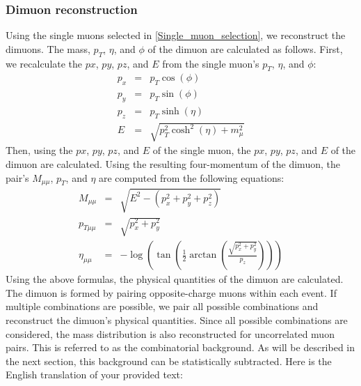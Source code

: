             \subsubsection{Dimuon reconstruction}
            \label{Dimuon_reco}
                Using the single muons selected in \ref{Single_muon_selection}, we reconstruct the dimuons. The mass, $p_T$, $\eta$, and $\phi$ of the dimuon are calculated as follows. First, we recalculate the $px$, $py$, $pz$, and $E$ from the single muon’s $p_T$, $\eta$, and $\phi$:
                \begin{eqnarray}
                    p_x &=& p_T \cos(\phi)\\
                    p_y &=& p_T \sin (\phi)\\
                    p_z &=& p_T \sinh (\eta)\\
                    E &=& \sqrt{p_T^2 \cosh^2(\eta) + m_\mu^2} 
                \end{eqnarray}
                Then, using the $px$, $py$, $pz$, and $E$ of the single muon, the $px$, $py$, $pz$, and $E$ of the dimuon are calculated. Using the resulting four-momentum of the dimuon, the pair’s $M_{\mu\mu}$, $p_T$, and $\eta$ are computed from the following equations:
                \begin{eqnarray}
                    M_{\mu\mu} &=& \sqrt{E^2 - (p_x^2 + p_y^2 + p_z^2)}\\
                    p_{T\mu\mu} &=& \sqrt{p_x^2 + p_y^2}\\
                    \eta_{\mu\mu} &=& -\log\left(\tan\left(\frac{1}{2}\arctan\left(\frac{\sqrt{p_x^2 + p_y^2}}{p_z}\right)\right)\right)
                \end{eqnarray}
                Using the above formulas, the physical quantities of the dimuon are calculated.
                The dimuon is formed by pairing opposite-charge muons within each event. If multiple combinations are possible, we pair all possible combinations and reconstruct the dimuon’s physical quantities. Since all possible combinations are considered, the mass distribution is also reconstructed for uncorrelated muon pairs. This is referred to as the combinatorial background. As will be described in the next section, this background can be statistically subtracted.
                Here is the English translation of your provided text:
                
